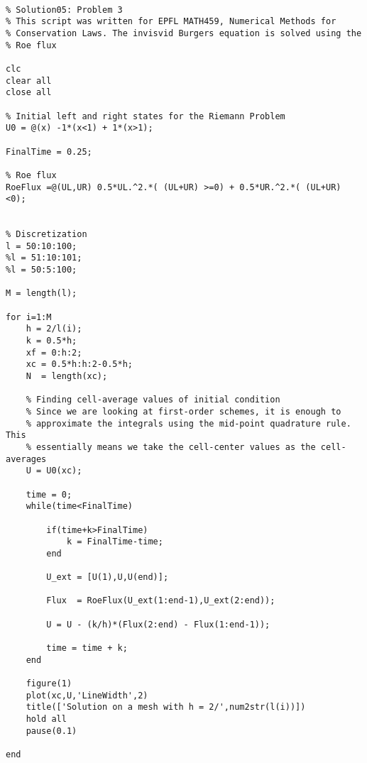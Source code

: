 \documentclass{article}
\begin{document}
\newpage
\begin{lstlisting}

% Solution05: Problem 3
% This script was written for EPFL MATH459, Numerical Methods for
% Conservation Laws. The invisvid Burgers equation is solved using the
% Roe flux

clc
clear all
close all

% Initial left and right states for the Riemann Problem
U0 = @(x) -1*(x<1) + 1*(x>1);

FinalTime = 0.25;

% Roe flux
RoeFlux =@(UL,UR) 0.5*UL.^2.*( (UL+UR) >=0) + 0.5*UR.^2.*( (UL+UR) <0);


% Discretization
l = 50:10:100;
%l = 51:10:101;
%l = 50:5:100;

M = length(l);

for i=1:M
    h = 2/l(i);
    k = 0.5*h;
    xf = 0:h:2;
    xc = 0.5*h:h:2-0.5*h;
    N  = length(xc);
    
    % Finding cell-average values of initial condition
    % Since we are looking at first-order schemes, it is enough to
    % approximate the integrals using the mid-point quadrature rule. This
    % essentially means we take the cell-center values as the cell-averages
    U = U0(xc);
    
    time = 0;
    while(time<FinalTime)
        
        if(time+k>FinalTime)
            k = FinalTime-time;
        end
        
        U_ext = [U(1),U,U(end)];
        
        Flux  = RoeFlux(U_ext(1:end-1),U_ext(2:end));
        
        U = U - (k/h)*(Flux(2:end) - Flux(1:end-1));
        
        time = time + k;
    end
    
    figure(1)
    plot(xc,U,'LineWidth',2)
    title(['Solution on a mesh with h = 2/',num2str(l(i))])
    hold all
    pause(0.1)
    
end




\end{lstlisting}
\end{document}
